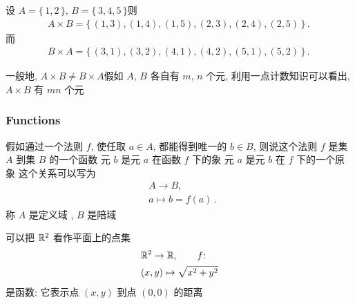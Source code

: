 \begin{example}
    设 $A = \{\, 1,2 \,\}$, $B = \{\, 3,4,5 \,\}$\period 则
    \begin{align*}
        A \times B = \{\, (1,3),(1,4),(1,5),(2,3),(2,4),(2,5) \,\}\period
    \end{align*}
    而
    \begin{align*}
        B \times A = \{\, (3,1),(3,2),(4,1),(4,2),(5,1),(5,2) \,\}\period
    \end{align*}
\end{example}

\begin{remark}
    一般地, $A \times B \neq B \times A$\period 假如 $A$, $B$ 各自有 $m$, $n$ 个元, 利用一点计数知识可以看出, $A \times B$ 有 $mn$ 个元\period
\end{remark}

\subsubsection*{Functions}

\begin{definition}
    假如通过一个法则 $f$, 使任取 $a \in A$, 都能得到唯一的 $b \in B$, 则说这个法则 $f$ 是集 $A$ 到集 $B$ 的一个函数 \period 元 $b$ 是元 $a$ 在函数 $f$ 下的象 \period 元 $a$ 是元 $b$ 在 $f$ 下的一个原象 \period 这个关系可以写为
    \begin{align*}
         & A \to B,  \tag*{$f$:}      \\
         & a \mapsto b = f(a) \period
    \end{align*}
    称 $A$ 是定义域 , $B$ 是陪域 \period
\end{definition}

\begin{example}
    可以把 $\mathbb{R}^2$ 看作平面上的点集\period
    \begin{align*}
         & \mathbb{R}^2 \to \mathbb{R},  \tag*{$f$:}  \\
         & (x,y) \mapsto \sqrt{x^2+y^2}
    \end{align*}
    是函数: 它表示点 $(x,y)$ 到点 $(0,0)$ 的距离\period
\end{example}

